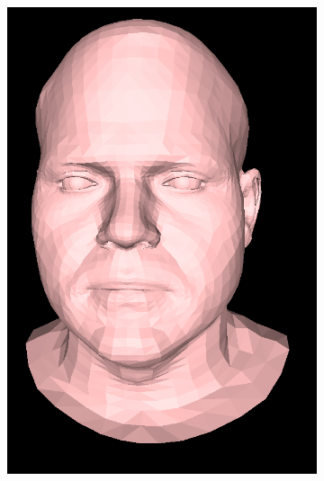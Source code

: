 \begin{figure}[h]
    \centering
    \begin{subfigure}[b]{0.4\textwidth}
        \includegraphics[width=\textwidth]{figures/dataset/subject2_unaligned.png}
    \end{subfigure}
    \begin{subfigure}[b]{0.4\textwidth}

\end{subfigure}
\end{figure}
